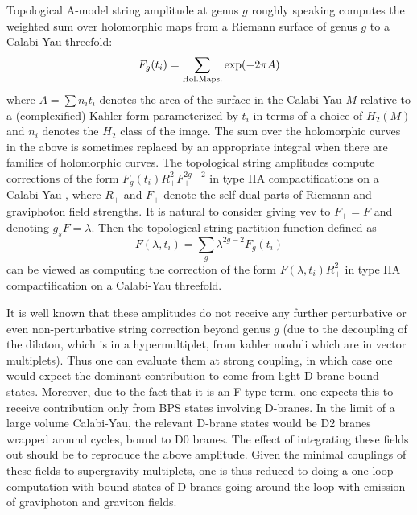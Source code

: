 Topological A-model string amplitude at genus $g$
roughly speaking computes the weighted sum over holomorphic maps
from a Riemann surface of genus $g$ to a Calabi-Yau threefold:
%
$$F_g(t_i) =\sum_{{\rm Hol. Maps.}}{\rm exp}(-2\pi A)$$
%
where $A=\sum n_it_i$ denotes the area of the surface in
the Calabi-Yau $M$ relative to a (complexified)
Kahler form parameterized by $t_i$
in terms of a choice of $H_2(M)$ and $n_i$ denotes
the $H_2$ class of the image.   The sum over the holomorphic
curves
in the above is sometimes replaced by an appropriate
integral when there are families of holomorphic curves.
The topological string amplitudes compute
corrections of the form $F_g(t_i)R_+^2 F_+^{2g-2}$ in type IIA
compactifications on a Calabi-Yau \bcovii \naret , where $R_+$ and
$F_+$ denote the self-dual parts of Riemann and graviphoton
field strengths.
It is natural to consider giving vev to $F_+=F$ and denoting
$g_sF=\lambda$.  Then the topological string partition function
defined as
%
$$F(\lambda ,t_i)=\sum_{g}\lambda^{2g-2}F_g(t_i)$$
%
can be viewed as computing the correction of the
form $F(\lambda ,t_i) R_+^2$ in type IIA compactification
on a Calabi-Yau threefold.

It is well known that these amplitudes do not receive
any further perturbative or even non-perturbative string correction beyond
genus $g$
(due to the decoupling of the dilaton, which is in a hypermultiplet, from
kahler moduli which are in vector multiplets).  Thus one can evaluate
them at strong coupling, in which case one would expect the dominant
contribution to come from light D-brane bound states.  Moreover,
due to the fact that it is an F-type term, one expects this
to receive contribution only from BPS states involving D-branes.
In the limit of a large volume Calabi-Yau, the relevant D-brane states would be
D2 branes wrapped around cycles, bound to D0 branes.  The effect
of integrating these fields out should be to reproduce the above
amplitude.  Given the minimal couplings of these fields to supergravity
multiplets, one is thus reduced to doing a one loop computation with
bound states of D-branes going around the loop with emission
of graviphoton and graviton fields.

